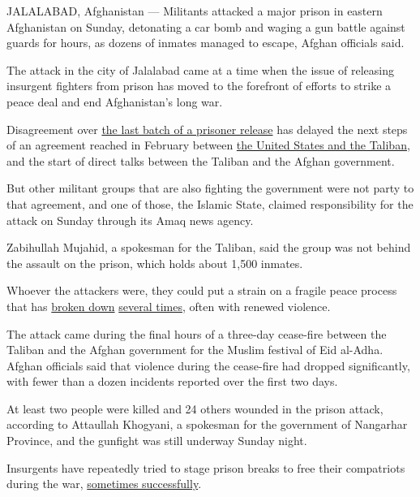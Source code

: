 JALALABAD, Afghanistan --- Militants attacked a major prison in eastern
Afghanistan on Sunday, detonating a car bomb and waging a gun battle
against guards for hours, as dozens of inmates managed to escape, Afghan
officials said.

The attack in the city of Jalalabad came at a time when the issue of
releasing insurgent fighters from prison has moved to the forefront of
efforts to strike a peace deal and end Afghanistan's long war.

Disagreement over
\href{https://www.nytimes3xbfgragh.onion/2020/07/28/world/asia/afghanistan-cease-fire-taliban.html}{the
last batch of a prisoner release} has delayed the next steps of an
agreement reached in February between
\href{https://www.nytimes3xbfgragh.onion/2020/02/29/world/asia/us-taliban-deal.html}{the
United States and the Taliban}, and the start of direct talks between
the Taliban and the Afghan government.

But other militant groups that are also fighting the government were not
party to that agreement, and one of those, the Islamic State, claimed
responsibility for the attack on Sunday through its Amaq news agency.

Zabihullah Mujahid, a spokesman for the Taliban, said the group was not
behind the assault on the prison, which holds about 1,500 inmates.

Whoever the attackers were, they could put a strain on a fragile peace
process that has
\href{https://www.nytimes3xbfgragh.onion/2019/09/08/world/asia/afghanistan-trump-camp-david-taliban.html}{broken
down}
\href{https://www.nytimes3xbfgragh.onion/2020/04/07/world/asia/afghan-prisoner-talks-collapse.html}{several
times}, often with renewed violence.

The attack came during the final hours of a three-day cease-fire between
the Taliban and the Afghan government for the Muslim festival of Eid
al-Adha. Afghan officials said that violence during the cease-fire had
dropped significantly, with fewer than a dozen incidents reported over
the first two days.

At least two people were killed and 24 others wounded in the prison
attack, according to Attaullah Khogyani, a spokesman for the government
of Nangarhar Province, and the gunfight was still underway Sunday night.

Insurgents have repeatedly tried to stage prison breaks to free their
compatriots during the war,
\href{https://www.nytimes3xbfgragh.onion/2011/04/26/world/asia/26afghanistan.html}{sometimes
successfully}.

